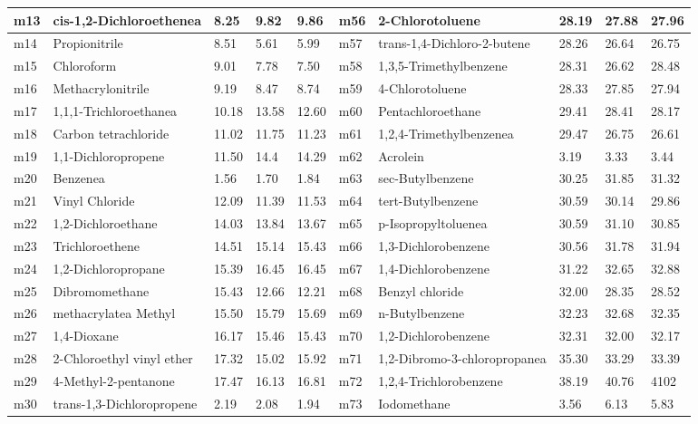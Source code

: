 \documentclass[11pt]{article}
\begin{document}
\begin{table}
\begin{tabular}{|l|l|l|l|l|l|l|l|l|l|}
\hline
m13 & cis-1,2-Dichloroethenea & 8.25 & 9.82 & 9.86 & m56 & 2-Chlorotoluene & 28.19 & 27.88 & 27.96 \\
\hline
m14 & Propionitrile & 8.51 & 5.61 & 5.99 & m57 & trans-1,4-Dichloro-2-butene & 28.26 & 26.64 & 26.75 \\
\hline
m15 & Chloroform & 9.01 & 7.78 & 7.50 & m58 & 1,3,5-Trimethylbenzene & 28.31 & 26.62 & 28.48 \\
\hline
m16 & Methacrylonitrile & 9.19 & 8.47 & 8.74 & m59 & 4-Chlorotoluene & 28.33 & 27.85 & 27.94 \\
\hline
m17 & 1,1,1-Trichloroethanea & 10.18 & 13.58 & 12.60 & m60 & Pentachloroethane & 29.41 & 28.41 & 28.17 \\
\hline
m18 & Carbon tetrachloride & 11.02 & 11.75 & 11.23 & m61 & 1,2,4-Trimethylbenzenea & 29.47 & 26.75 & 26.61 \\
\hline
m19 & 1,1-Dichloropropene & 11.50 & 14.4 & 14.29 & m62 & Acrolein & 3.19 & 3.33 & 3.44 \\
\hline
m20 & Benzenea & 1.56 & 1.70 & 1.84 & m63 & sec-Butylbenzene & 30.25 & 31.85 & 31.32 \\
\hline
m21 & Vinyl Chloride & 12.09 & 11.39 & 11.53 & m64 & tert-Butylbenzene & 30.59 & 30.14 & 29.86 \\
\hline
m22 & 1,2-Dichloroethane & 14.03 & 13.84 & 13.67 & m65 & p-Isopropyltoluenea & 30.59 & 31.10 & 30.85 \\
\hline
m23 & Trichloroethene & 14.51 & 15.14 & 15.43 & m66 & 1,3-Dichlorobenzene & 30.56 & 31.78 & 31.94 \\
\hline
m24 & 1,2-Dichloropropane & 15.39 & 16.45 & 16.45 & m67 & 1,4-Dichlorobenzene & 31.22 & 32.65 & 32.88 \\
\hline
m25 & Dibromomethane & 15.43 & 12.66 & 12.21 & m68 & Benzyl chloride & 32.00 & 28.35 & 28.52 \\
\hline
m26 & methacrylatea Methyl & 15.50 & 15.79 & 15.69 & m69 & n-Butylbenzene & 32.23 & 32.68 & 32.35 \\
\hline
m27 & 1,4-Dioxane & 16.17 & 15.46 & 15.43 & m70 & 1,2-Dichlorobenzene & 32.31 & 32.00 & 32.17 \\
\hline
m28 & 2-Chloroethyl vinyl ether & 17.32 & 15.02 & 15.92 & m71 & 1,2-Dibromo-3-chloropropanea & 35.30 & 33.29 & 33.39 \\
\hline
m29 & 4-Methyl-2-pentanone & 17.47 & 16.13 & 16.81 & m72 & 1,2,4-Trichlorobenzene & 38.19 & 40.76 & 4102 \\
\hline
m30 & trans-1,3-Dichloropropene & 2.19 & 2.08 & 1.94 & m73 & Iodomethane & 3.56 & 6.13 & 5.83 \\

\end{tabular}
\end{table}
\end{document}
